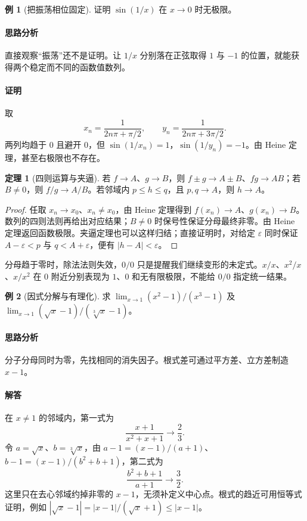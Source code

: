 \documentclass[UTF8,fontset=fandol,12pt,oneside,openany]{ctexrep}
\theoremstyle{definition}
\newtheorem{theorem}{定理}[chapter]
\newtheorem{example}{例}[chapter]
\begin{document}
\begin{example}[把振荡相位固定]
证明 $\sin(1/x)$ 在 $x\to0$ 时无极限。
\end{example}
\paragraph{思路分析}直接观察“振荡”还不是证明。让 $1/x$ 分别落在正弦取得 $1$ 与 $-1$ 的位置，就能获得两个稳定而不同的函数值数列。
\paragraph{证明}取
\[
x_n=\frac1{2n\pi+\pi/2},\qquad
y_n=\frac1{2n\pi+3\pi/2}.
\]
两列均趋于 $0$ 且避开 $0$，但 $\sin(1/x_n)=1$，$\sin(1/y_n)=-1$。由 Heine 定理，甚至右极限也不存在。

\begin{theorem}[四则运算与夹逼]
若 $f\to A$、$g\to B$，则 $f\pm g\to A\pm B$、$fg\to AB$；若 $B\ne0$，则 $f/g\to A/B$。若邻域内 $p\le h\le q$，且 $p,q\to A$，则 $h\to A$。
\end{theorem}
\begin{proof}
任取 $x_n\to x_0$、$x_n\ne x_0$，由 Heine 定理得到 $f(x_n)\to A$、$g(x_n)\to B$。数列的四则法则再给出对应结果；$B\ne0$ 时保号性保证分母最终非零。由 Heine 定理返回函数极限。夹逼定理也可以这样归结；直接证明时，对给定 $\varepsilon$ 同时保证 $A-\varepsilon<p$ 与 $q<A+\varepsilon$，便有 $|h-A|<\varepsilon$。
\end{proof}
分母趋于零时，除法法则失效，$0/0$ 只是提醒我们继续变形的未定式。$x/x$、$x^2/x$、$x/x^2$ 在 $0$ 附近分别表现为 $1$、$0$ 和无有限极限，不能给 $0/0$ 指定统一结果。

\begin{example}[因式分解与有理化]
求 $\lim_{x\to1}(x^2-1)/(x^3-1)$ 及 $\lim_{x\to1}(\sqrt{x}-1)/(\sqrt[3]{x}-1)$。
\end{example}
\paragraph{思路分析}分子分母同时为零，先找相同的消失因子。根式差可通过平方差、立方差制造 $x-1$。
\paragraph{解答}在 $x\ne1$ 的邻域内，第一式为
\[
\frac{x+1}{x^2+x+1}\longrightarrow\frac23.
\]
令 $a=\sqrt{x}$、$b=\sqrt[3]{x}$，由 $a-1=(x-1)/(a+1)$、$b-1=(x-1)/(b^2+b+1)$，第二式为
\[
\frac{b^2+b+1}{a+1}\longrightarrow\frac32.
\]
这里只在去心邻域约掉非零的 $x-1$，无须补定义中心点。根式的趋近可用恒等式证明，例如 $|\sqrt{x}-1|=|x-1|/(\sqrt{x}+1)\le|x-1|$。
\end{document}

